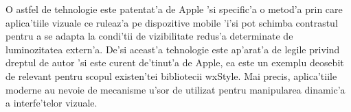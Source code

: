 \medskip

O astfel de tehnologie este patentat'a de Apple\cite{uicontrast} 'si specific'a o metod'a prin care aplica'tiile vizuale ce ruleaz'a pe dispozitive mobile 'i'si pot schimba contrastul pentru a se adapta la condi'tii de vizibilitate redus'a determinate de luminozitatea extern'a. De'si aceast'a tehnologie este ap'arat'a de legile privind dreptul de autor 'si este curent de'tinut'a de Apple, ea este un exemplu deosebit de relevant pentru scopul existen'tei bibliotecii wxStyle. Mai precis, aplica'tiile moderne au nevoie de mecanisme u'sor de utilizat pentru manipularea dinamic'a a interfe'telor vizuale.